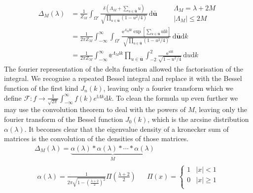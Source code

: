 \documentclass{article}[12pt]
\numberwithin{equation}{section}
\begin{document}
\begin{align*}
  \Delta_M(\lambda)&=\frac{1}{Z_M}
  \int_{\Omega'}\!
  \frac{\delta(\Lambda_M+\sum_{u\in\bar{\mathbf{u}}}u)}
  {\sqrt{\prod_{u\in\bar{\mathbf{u}}}(1-u^2/4) }}
  \,\mathrm{d}\bar{\mathbf{u}}
  \qquad
  \begin{matrix}
    \Lambda_M=\lambda+2M \\
    |\Lambda_M|\leq2M
  \end{matrix}\\
  &=\frac{1}{2\pi Z_M}
  \int_{-\infty}^{\infty}\int_{\Omega'}\!
  \frac{\mathbb{e}^{\Lambda_M\mathbb{i}k}\exp[\sum_{u\in\bar{\mathbf{u}}}u\mathbb{i}k]}
  {\sqrt{\prod_{u\in\bar{\mathbf{u}}}(1-u^2/4) }}
  \,\mathrm{d}\bar{\mathbf{u}}\mathrm{d}k\\
  &=\frac{1}{2\pi Z_M}
  \int_{-\infty}^{\infty}\mathbb{e}^{\Lambda_M\mathbb{i}k}
  \prod_{u\in\bar{\mathbf{u}}}\int_{-2}^{2}\!
  \frac{\mathbb{e}^{u\mathbb{i}k}}
  {\sqrt{1-u^2/4}}
  \,\mathrm{d}u\mathrm{d}k
\end{align*}
The fourier representation of the delta function allowed the
factorisation of the integral. We recognise a repeated Bessel
integral and replace it with the Bessel function of the first kind
$J_n(k)$, leaving only a fourier transform which we define
$ \mathcal{F} :
f\rightarrow \frac{1}{\sqrt{2\pi}}
\int_{-\infty}^{\infty}f(k)e^{\mathbb{i}\Lambda k}\mathrm{d}k$. To clean
the formula up even further we may use the convolution
theorem to deal with the powers of $M$, leaving only the fourier
transform of the Bessel function $J_0(k)$, which is the arcsine
distribution $\alpha(\lambda)$. It becomes clear that the eigenvalue
density of a kronecker sum of matrices is the convolution of the densities
of those matrices.
\begin{align}
  \Delta_M(\lambda)=\underbrace{
  \alpha(\lambda)*\alpha(\lambda)*\cdots*\alpha(\lambda)}_{M}\qquad\qquad\qquad\\
  \begin{matrix}
    \alpha(\lambda)=
      \frac{1}{2\pi\sqrt{1-\left(\frac{\lambda+2}{2}\right)^2}}
      \Pi\left(\frac{\lambda+2}{2}\right)
    &&
    \Pi(x)=
      \begin{cases}
        1 & |x|<1\\
        0 & |x|\geq1\\
      \end{cases}
  \end{matrix}
  \label{eq:arcsine}
\end{align}
\end{document}
